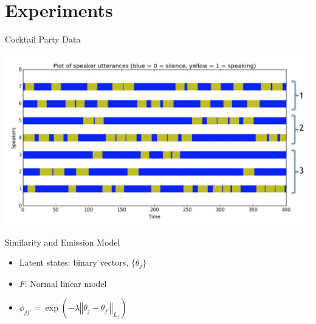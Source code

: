 \documentclass[11pt, mathserif, handout, table]{beamer}
\begin{document}
\section{Experiments}
\label{sec:experiments}

\begin{frame}{Cocktail Party Data}
\vspace{-0.3in}
  \begin{center}
    \includegraphics[width=\textwidth]{img/cocktail-with-groups.png}
  \end{center}
\end{frame}

\begin{frame}{Similarity and Emission Model}
\begin{itemize}
\item Latent states: binary vectors, $\{\theta_j\}$
\item $F$: Normal linear model
\item $\phi_{jj'} = \exp(-\lambda \left\Vert\theta_j -
\theta_{j'}\right\Vert_{L_1})$
\end{itemize}
\end{frame}
\end{document}
